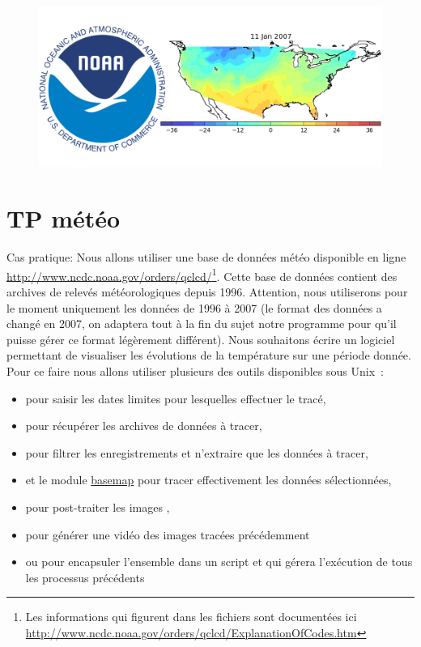 
\begin{figure}[htbp]
\includegraphics[width=\linewidth]{Figs/logo_meteo.png}
\end{figure}

\section{TP météo}

Cas pratique: Nous allons utiliser une base de données météo
disponible en ligne
\url{http://www.ncdc.noaa.gov/orders/qclcd/}\footnote{Les informations
  qui figurent dans les fichiers sont documentées ici
  \url{http://www.ncdc.noaa.gov/orders/qclcd/ExplanationOfCodes.htm}}. Cette
base de données contient des archives de relevés météorologiques depuis
1996. Attention, nous utiliserons pour le moment uniquement les
données de 1996 à 2007 (le format des données a changé en 2007,
on adaptera tout à la fin du sujet notre programme pour qu'il puisse
gérer ce format légèrement différent). Nous souhaitons écrire un logiciel permettant de visualiser les évolutions de la température sur une période
donnée. Pour ce faire nous allons utiliser plusieurs des outils
disponibles sous Unix~:
\begin{itemize}
\item \zenity pour saisir les dates limites pour lesquelles effectuer le tracé,
\item \wget pour récupérer les archives de données à tracer,
\item \awk pour filtrer les enregistrements et n'extraire que les
  données à tracer,
\item \python et le module \href{http://matplotlib.org/basemap/users/examples.html}{basemap} pour tracer effectivement les données sélectionnées,
\item \imagemagick pour post-traiter les images ,
\item \ffmpeg pour générer une vidéo des images tracées
  précédemment
\item \makefile ou \bashcmd pour encapsuler l'ensemble dans un script et
  qui gérera l'exécution de tous les processus précédents
\end{itemize}

